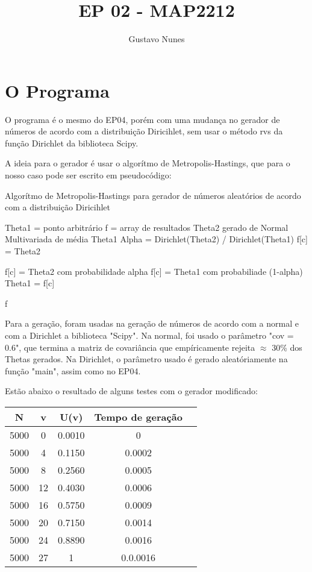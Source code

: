 \documentclass{article}
\date{}
\title{\vspace{-3.0cm}EP 02 - MAP2212}
\author{Gustavo Nunes }
\begin{document}
	
	\maketitle
	
	\section{O Programa}
	O programa é o mesmo do EP04, porém com uma mudança no gerador de números de acordo com a distribuição Diricihlet, sem usar o método rvs da função Dirichlet da biblioteca Scipy. 
	
	A ideia para o gerador é usar o algorítmo de Metropolis-Hastings, que para o nosso caso pode ser escrito em pseudocódigo: 
\begin{algorithm}
	\caption{Algorítmo de Metropolis-Hastings para gerador de números aleatórios de acordo com a distribuição Diricihlet}\label{}
	\begin{algorithmic}
		\State Theta1 = ponto arbitrário 
		\State f = array de resultados 
		\State Theta2 gerado de Normal Multivariada de média Theta1
		\State Alpha = Dirichlet(Theta2) / Dirichlet(Theta1)
			\State f[c] = Theta2 

			\State f[c] = Theta2 com probabilidade alpha
			\State f[c] = Theta1 com probabiliade (1-alpha)
		\EndIf
		\State Theta1 = f[c]

		\EndWhile
		\State
		\Return f
	\end{algorithmic}
\end{algorithm}
	
Para a geração, foram usadas na geração de números de acordo com a normal e com a Dirichlet a biblioteca "Scipy". Na normal, foi usado o parâmetro "cov = 0.6", que termina a matriz de covariância que empíricamente rejeita $\approx$ 30\% dos Thetas gerados. Na Dirichlet, o parâmetro usado é gerado aleatóriamente na função "main", assim como no EP04. 

Estão abaixo o resultado de alguns testes com o gerador modificado: 

	\begin{table}[htbp]
            \centering
		\begin{tabular}{||c|c|c|c|c||}
			N & v & U(v) & Tempo de geração\\
			\hline
			5000 & 0 & 0.0010 & 0 \\	
			5000 & 4 & 0.1150 & 0.0002 \\
			5000 & 8 & 0.2560 & 0.0005 \\
			5000 & 12 & 0.4030 & 0.0006 \\
			5000 & 16 & 0.5750 & 0.0009 \\
			5000 & 20 & 0.7150 & 0.0014 \\
			5000 & 24 & 0.8890 & 0.0016 \\
			5000 & 27 & 1 & 0.0.0016 \\
		\end{tabular}
	\end{table}
\end{document}
